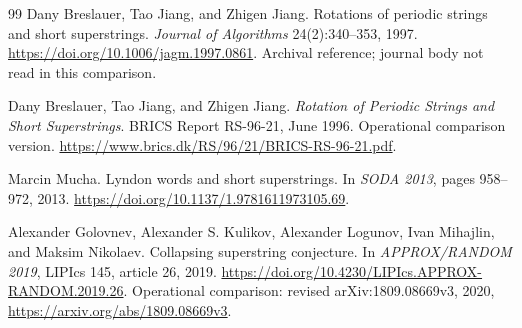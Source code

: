 \begin{thebibliography}{99}
 Dany Breslauer, Tao Jiang, and Zhigen Jiang.
Rotations of periodic strings and short superstrings.
\emph{Journal of Algorithms} 24(2):340--353, 1997.
\url{https://doi.org/10.1006/jagm.1997.0861}.
Archival reference; journal body not read in this comparison.

 Dany Breslauer, Tao Jiang, and Zhigen Jiang.
\emph{Rotation of Periodic Strings and Short Superstrings}.
BRICS Report RS-96-21, June 1996. Operational comparison version.
\url{https://www.brics.dk/RS/96/21/BRICS-RS-96-21.pdf}.

 Marcin Mucha. Lyndon words and short superstrings.
In \emph{SODA 2013}, pages 958--972, 2013.
\url{https://doi.org/10.1137/1.9781611973105.69}.

 Alexander Golovnev, Alexander S. Kulikov,
Alexander Logunov, Ivan Mihajlin, and Maksim Nikolaev.
Collapsing superstring conjecture.
In \emph{APPROX/RANDOM 2019}, LIPIcs 145, article 26, 2019.
\url{https://doi.org/10.4230/LIPIcs.APPROX-RANDOM.2019.26}.
Operational comparison: revised arXiv:1809.08669v3, 2020,
\url{https://arxiv.org/abs/1809.08669v3}.
\end{thebibliography}
